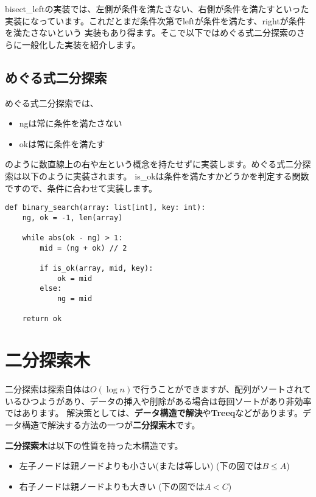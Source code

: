 \documentclass{jlreq}
\begin{document}
bisect\_leftの実装では、左側が条件を満たさない、右側が条件を満たすといった実装になっています。これだとまだ条件次第でleftが条件を満たす、rightが条件を満たさないという
実装もあり得ます。そこで以下ではめぐる式二分探索のさらに一般化した実装を紹介します。

\subsection{めぐる式二分探索}

めぐる式二分探索では、

\begin{itemize}
  \item ngは常に条件を満たさない
  \item okは常に条件を満たす
\end{itemize}

のように数直線上の右や左という概念を持たせずに実装します。めぐる式二分探索は以下のように実装されます。
is\_okは条件を満たすかどうかを判定する関数ですので、条件に合わせて実装します。

\begin{lstlisting}[caption=めぐる式二分探索, frame=TRBL, label={megru}]
def binary_search(array: list[int], key: int):
    ng, ok = -1, len(array)
    
    while abs(ok - ng) > 1:
        mid = (ng + ok) // 2
        
        if is_ok(array, mid, key):
            ok = mid
        else:
            ng = mid
    
    return ok
\end{lstlisting}

\newpage

\section{二分探索木}
二分探索は探索自体は$O(\log n)$で行うことができますが、配列がソートされているひつようがあり、データの挿入や削除がある場合は毎回ソートがあり非効率ではあります。
解決策としては、\textbf{データ構造で解決}や\textbf{Treeq}などがあります。データ構造で解決する方法の一つが\textbf{二分探索木}です。

\textbf{二分探索木}は以下の性質を持った木構造です。

\begin{itemize}
  \item 左子ノードは親ノードよりも小さい(または等しい) (下の図では$B \leq A$)
  \item 右子ノードは親ノードよりも大きい (下の図では$A < C$)
\end{itemize}
\end{document}
